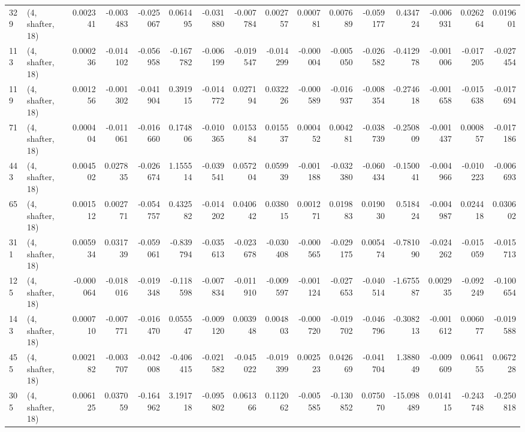 \begin{tabular}{llrrrrrrrrrrrrrr}
329 &  (4, shafter, 18) &   0.002341 & -0.003483 & -0.025067 &    0.061495 & -0.031880 &  -0.007784 &  0.002757 &  0.000781 &  0.007689 & -0.059177 &    0.434724 & -0.006931 &  0.026264 &  0.019601 \\
113 &  (4, shafter, 18) &   0.000236 & -0.014102 & -0.056958 &   -0.167782 & -0.006199 &  -0.019547 & -0.014299 & -0.000004 & -0.005050 & -0.026582 &   -0.412978 & -0.001006 & -0.017205 & -0.027454 \\
119 &  (4, shafter, 18) &   0.001256 & -0.001302 & -0.041904 &    0.391915 & -0.014772 &   0.027194 &  0.032226 & -0.000589 & -0.016937 & -0.008354 &   -0.274618 & -0.001658 & -0.015638 & -0.017694 \\
71  &  (4, shafter, 18) &   0.000404 & -0.011061 & -0.016660 &    0.174806 & -0.010365 &   0.015384 &  0.015537 &  0.000452 &  0.004281 & -0.038739 &   -0.250809 & -0.001437 &  0.000857 & -0.017186 \\
443 &  (4, shafter, 18) &   0.004502 &  0.027835 & -0.026674 &    1.155514 & -0.039541 &   0.057204 &  0.059939 & -0.001188 & -0.032380 & -0.060434 &   -0.150041 & -0.004966 & -0.010223 & -0.006693 \\
65  &  (4, shafter, 18) &   0.001512 &  0.002771 & -0.054757 &    0.432582 & -0.014202 &   0.040642 &  0.038015 &  0.001271 &  0.019883 &  0.019030 &    0.518424 & -0.004987 &  0.024418 &  0.030602 \\
311 &  (4, shafter, 18) &   0.005934 &  0.031739 & -0.059061 &   -0.839794 & -0.035613 &  -0.023678 & -0.030408 & -0.000565 & -0.029175 &  0.005474 &   -0.781090 & -0.024262 & -0.015059 & -0.015713 \\
125 &  (4, shafter, 18) &  -0.000064 & -0.018016 & -0.019348 &   -0.118598 & -0.007834 &  -0.011910 & -0.009597 & -0.001124 & -0.027653 & -0.040514 &   -1.675587 &  0.002935 & -0.092249 & -0.100654 \\
143 &  (4, shafter, 18) &   0.000710 & -0.007771 & -0.016470 &    0.055547 & -0.009120 &   0.003948 &  0.004803 & -0.000720 & -0.019702 & -0.046796 &   -0.308213 & -0.001612 &  0.006077 & -0.019588 \\
455 &  (4, shafter, 18) &   0.002182 & -0.003707 & -0.042008 &   -0.406415 & -0.021582 &  -0.045022 & -0.019399 &  0.002523 &  0.042669 & -0.041704 &    1.388049 & -0.009609 &  0.064155 &  0.067228 \\
305 &  (4, shafter, 18) &   0.006125 &  0.037059 & -0.164962 &    3.191718 & -0.095802 &   0.061366 &  0.112062 & -0.005585 & -0.130852 &  0.075070 &  -15.098489 &  0.014115 & -0.243748 & -0.250818 \\

\end{tabular}
